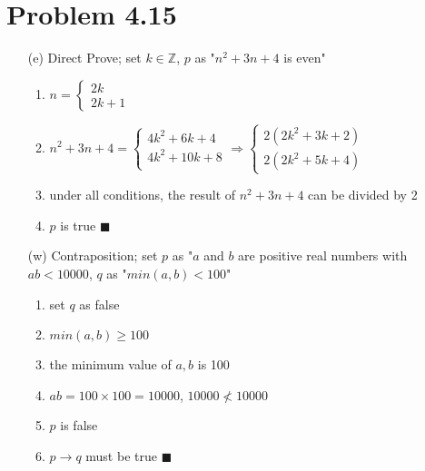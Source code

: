 \documentclass{article}
\def\math#1{$#1$}
\begin{document}
\section{Problem 4.15}
\begin{itemize}
    \item [(e)] Direct Prove; set \math{k \in \mathbb{Z}}, \math{p} as "\math{n^2 + 3n + 4} is even"
        \begin{enumerate}
            \item \math{n = \begin{cases}
                            2k \\
                            2k + 1
                        \end{cases}
                        }
            \item \math{n^2 + 3n + 4 = 
                        \begin{cases}
                            4k^2 + 6k + 4 \\
                            4{k}^2 + 10k + 8 \\ 
                        \end{cases} \Rightarrow 
                        \begin{cases}
                            2(2{k}^2 + 3k + 2) \\
                            2(2{k}^2 + 5k + 4)
                        \end{cases}
                        }
            \item under all conditions, the result of \math{n^2 + 3n + 4} can be divided by 2
            \item \math{p} is true
            \hfill{\math{\blacksquare}}
        \end{enumerate}
    \item [(w)] Contraposition; set \math{p} as "\math{a} and \math{b} are positive real numbers with \math{ab < 10000}, \math{q} as "\math{min(a, b) < 100}"
        \begin{enumerate}
            \item set \math{q} as false
            \item \math{min(a, b) \geq 100}
            \item the minimum value of \math{a, b} is 100
            \item \math{ab = 100 \times 100 = 10000}, \math{10000 \nless 10000}
            \item \math{p} is false
            \item \math{p \to q} must be true 
            \hfill{\math{\blacksquare}}
        \end{enumerate}
\end{itemize}
\end{document}
